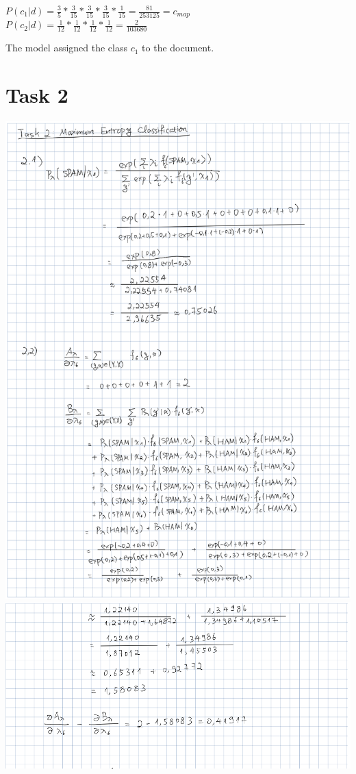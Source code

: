 \documentclass[a4paper]{scrartcl}
\begin{document}
$P(c_1|d) = \frac{3}{5} * \frac{3}{15} * \frac{3}{15} * \frac{3}{15} * \frac{1}{15} = \frac{81}{253125} = c_{map}$\\
$P(c_2|d) = \frac{1}{12} * \frac{1}{12} * \frac{1}{12} * \frac{1}{12} = \frac{2}{103680}$

The model assigned the class $c_1$ to the document.

\section*{Task 2}
\includegraphics[width=.9\textwidth]{img/task2a.png}
\newpage
\includegraphics[width=.9\textwidth]{img/task2b.png}
\end{document}
